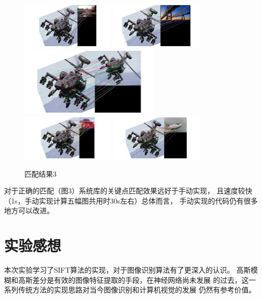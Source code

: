 \documentclass{article}
\begin{document}
\begin{figure}[h]
\centering
\includegraphics[width=0.4\textwidth]{./official/1}
\includegraphics[width=0.4\textwidth]{./official/2}
\includegraphics[width=0.6\textwidth]{./official/3}
\includegraphics[width=0.4\textwidth]{./official/4}
\includegraphics[width=0.4\textwidth]{./official/5}
\caption{匹配结果3}
\end{figure}

    对于正确的匹配（图3）系统库的关键点匹配效果远好于手动实现，
    且速度较快（1s，手动实现计算五幅图共用时30s左右）总体而言，
    手动实现的代码仍有很多地方可以改进。

\section{实验感想}

    本次实验学习了SIFT算法的实现，对于图像识别算法有了更深入的认识。
    高斯模糊和高斯差分是有效的图像特征提取的手段，在神经网络尚未发展
    的过去，这一系列传统方法的实现思路对当今图像识别和计算机视觉的发展
    仍然有参考价值。
\end{document}
